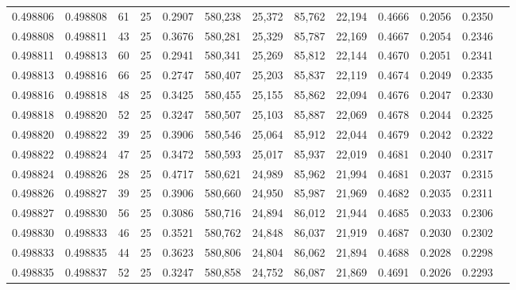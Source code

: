 \begin{tabular}{rrrrrrrrrrrrr}
0.498806 & 0.498808 &    61 &  25 &                                     0.2907 & 580,238 &  25,372 &  85,762 &  22,194 & 0.4666 & 0.2056 & 0.2350 \\
0.498808 & 0.498811 &    43 &  25 &                                     0.3676 & 580,281 &  25,329 &  85,787 &  22,169 & 0.4667 & 0.2054 & 0.2346 \\
0.498811 & 0.498813 &    60 &  25 &                                     0.2941 & 580,341 &  25,269 &  85,812 &  22,144 & 0.4670 & 0.2051 & 0.2341 \\
0.498813 & 0.498816 &    66 &  25 &                                     0.2747 & 580,407 &  25,203 &  85,837 &  22,119 & 0.4674 & 0.2049 & 0.2335 \\
0.498816 & 0.498818 &    48 &  25 &                                     0.3425 & 580,455 &  25,155 &  85,862 &  22,094 & 0.4676 & 0.2047 & 0.2330 \\
0.498818 & 0.498820 &    52 &  25 &                                     0.3247 & 580,507 &  25,103 &  85,887 &  22,069 & 0.4678 & 0.2044 & 0.2325 \\
0.498820 & 0.498822 &    39 &  25 &                                     0.3906 & 580,546 &  25,064 &  85,912 &  22,044 & 0.4679 & 0.2042 & 0.2322 \\
0.498822 & 0.498824 &    47 &  25 &                                     0.3472 & 580,593 &  25,017 &  85,937 &  22,019 & 0.4681 & 0.2040 & 0.2317 \\
0.498824 & 0.498826 &    28 &  25 &                                     0.4717 & 580,621 &  24,989 &  85,962 &  21,994 & 0.4681 & 0.2037 & 0.2315 \\
0.498826 & 0.498827 &    39 &  25 &                                     0.3906 & 580,660 &  24,950 &  85,987 &  21,969 & 0.4682 & 0.2035 & 0.2311 \\
0.498827 & 0.498830 &    56 &  25 &                                     0.3086 & 580,716 &  24,894 &  86,012 &  21,944 & 0.4685 & 0.2033 & 0.2306 \\
0.498830 & 0.498833 &    46 &  25 &                                     0.3521 & 580,762 &  24,848 &  86,037 &  21,919 & 0.4687 & 0.2030 & 0.2302 \\
0.498833 & 0.498835 &    44 &  25 &                                     0.3623 & 580,806 &  24,804 &  86,062 &  21,894 & 0.4688 & 0.2028 & 0.2298 \\
0.498835 & 0.498837 &    52 &  25 &                                     0.3247 & 580,858 &  24,752 &  86,087 &  21,869 & 0.4691 & 0.2026 & 0.2293 \\

\end{tabular}
